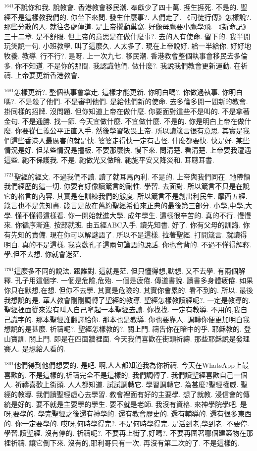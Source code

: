 \documentclass{book}
\begin{document}
$^{1641}$不說你和我.
說教會.
香港教會移民潮.
奉獻少了四十萬.
捱生捱死.
不是的.
聖經不是這樣教我們的.
你坐下來問.
發生什麼事?.
人們走了.
《司徒行傳》怎樣說?.
那些分散的人.
就往各處傳道.
是上帝攪動巢窩.
好像母鷹要小鷹學飛.
《新命記》三十二章.
是不舒服.
但上帝的意思是在做什麼事?.
去的人有使命.
留下的.
我半開玩笑說一句.
小班教學.
叫了這麼久.
人太多了.
現在上帝說好.
給一半給你.
好好地牧養.
教導.
行不行?.
是呀.
上一次九七.
移民潮.
香港教會整個執事會移民去多倫多.
你不知道.
不是你的那間.
我認識他們.
做什麼?.
我說我們教會更新運動.
在祈禱.
上帝要更新香港教會.

$^{1681}$怎樣更新?.
整個執事會拿走.
這樣才能更新.
你明白嗎?.
你做過執事.
你明白嗎?.
不是殺了他們.
不是審判他們.
是給他們新的使命.
去多倫多開一間新的教會.
掛同樣的招牌.
沒問題.
但你知道上帝在做什麼.
你要面對這些不是叫的.
不是拿著金句.
不是通勝.
找一節.
今天宜做什麼.
不宜做什麼.
不是的.
你是明白上帝在做什麼.
你要從仁義公平正直入手.
然後學習敬畏上帝.
所以讀箴言很有意思.
其實是我們這些香港人最厲害的就是快.
婆婆走得快一定有古怪.
什麼都要快.
快是好.
某些情況是好.
但某些情況是撞板.
不要那麼快.
慢下來.
問清楚.
看清楚.
上帝要我遭遇這些.
祂不保護我.
不是.
祂做光又做暗.
祂施平安又降災和.
耳聰耳書.

$^{1721}$聖經的經文.
不過我們不讀.
讀了就耳馬內利.
不是的.
上帝與我們同在.
祂帶領我們經歷的這一切.
你要有好像讀箴言的耐性.
學習.
去面對.
所以箴言不只是在說它的格言的內容.
其實是在訓練我們的態度.
所以箴言不是創出利民生.
摩西五經.
箴言也不是先知書.
箴言是放在舊約聖經希伯來正典的最後第三部分.
小學,中學,大學.
懂不懂得這樣看.
你一開始就進大學.
成年學生.
這樣很辛苦的.
真的不行.
慢慢來.
你循序漸進.
按部就班.
由五經ABC入手.
讀先知書.
好了.
你有父母的訓誨.
你有先知的責備.
現在你可以解謎語了.
所以不是這樣.
拉著聖經.
打開箴言.
就讀得明白.
真的不是這樣.
我喜歡孔子這兩句論語的說話.
你也會背的.
不過不懂得解釋.
學,但不去想.
你就會迷茫.

$^{1761}$這麼多不同的說法.
跟誰對.
這就是茫.
但只懂得想,默想.
又不去學.
有兩個解釋.
孔子用這個字.
一個是危險,危殆.
一個是疲倦.
傳道書說.
讀書多身體疲倦.
如果你只在默想,在想.
但你不去學.
其實是危險的.
其實你會累的.
看不到的.
所以.
最後我想說的是.
華人教會剛剛調轉了聖經的教導.
聖經怎樣教讀經呢?.
一定是教導的.
聖經裡面從來沒有叫人自己拿起一本聖經去讀.
你找找.
一定有教導.
不用的,我自己識字的.
那本聖經誰翻譯給你.
那本也是教導.
你也要靠人.
調轉你便更加明白我想說的是甚麼.
祈禱呢?.
聖經怎樣教的?.
關上門.
禱告你在暗中的乎.
耶穌教的.
登山寶訓.
關上門.
即是在四面牆裡面.
今天我們喜歡在街頭祈禱.
那些耶穌說是發理賽人.
是想給人看的.

$^{1801}$他們得到他們想要的.
是吧.
啊,人人都知道我為你祈禱.
今天在WhatsApp上最喜歡的.
不是這樣的,祈禱完全不是這樣的.
我們調轉了.
我們讀聖經喜歡自己一個人.
祈禱喜歡上街頭.
人人都知道.
試試調轉它.
學習調轉它.
為甚麼?聖經權威.
聖經的教導.
我們讀聖經虛心去學習.
教會裡面有好的主要學.
想了就教.
浸信會的傳統是好的.
要不就是主要學的學生.
要不就是老師.
我沒有資格.
來神學院學吧.
是呀,要學的.
學完聖經之後還有神學的.
還有教會歷史的.
還有輔導的.
還有很多東西的.
你一定要學的.
哎呀,何時學得完?.
不是何時學得完.
是活到老,學到老.
不要停.
學習,讀聖經.
沒有停的.
祈禱呢?.
不要再上街了,好嗎?.
不要再圍著哪個建築物在那裡祈禱.
讓它倒下來.
沒有的,耶利哥只有一次.
再沒有第二次的了.
不是這樣的.
\end{document}
